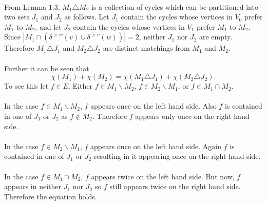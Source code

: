 \documentclass[letterpaper,12pt,oneside,onecolumn]{article}
\begin{document}
\paragraph{}
From Lemma $1.3$, $M_1 \triangle M_2$ is a collection of cycles which can be partitioned into two sets $J_1$ and $J_2$ as follows. Let $J_1$ contain the cycles whose vertices in $V_0$ prefer $M_1$ to $M_2$, and let $J_2$ contain the cycles whose vertices in $V_1$ prefer $M_1$ to $M_2$. Since $|M_1 \cap(\delta^{>w}(v) \cup \delta^{>v}(w))| = 2$, neither $J_1$ nor $J_2$ are empty. Therefore $M_1 \triangle J_1$ and $M_2 \triangle J_2$ are distinct matchings from $M_1$ and $M_2$.
\paragraph{}
Further it can be seen that
$$  \chi(M_1) + \chi(M_2) = \chi(M_1 \triangle J_1) + \chi(M_2 \triangle J_2). $$
To see this let $f \in E$. Either $f \in M_1\backslash M_2$, $f\in M_2\backslash M_1$, or $f \in M_1 \cap M_2$.
\paragraph{} In the case $f \in M_1\backslash M_2$, $f$ appears once on the left hand side. Also $f$ is contained in one of $J_1$ or $J_2$ as $f \not\in M_2$. Therefore $f$ appears only once on the right hand side.
\paragraph{} In the case $f \in M_2 \backslash M_1$, $f$ appears once on the left hand side. Again $f$ is contained in one of $J_1$ or $J_2$ resulting in it appearing once on the right hand side.
\paragraph{} In the case $f \in M_1 \cap M_2$, $f$ appears twice on the left hand side. But now, $f$ appears in neither $J_1$ nor $J_2$ so $f$ still appears twice on the right hand side. Therefore the equation holds.
\end{document}

